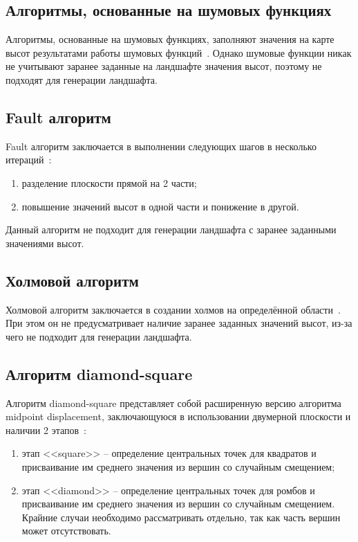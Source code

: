 \subsection{Алгоритмы, основанные на шумовых функциях}

Алгоритмы, основанные на шумовых функциях, заполняют значения на карте высот результатами работы шумовых функций~\cite{noises}. Однако шумовые функции никак не учитывают заранее заданные на ландшафте значения высот, поэтому не подходят для генерации ландшафта.

\subsection{Fault алгоритм}

Fault алгоритм заключается в выполнении следующих шагов в несколько итераций~\cite{nohabrinsource}:

\begin{enumerate}
	\item разделение плоскости прямой на 2 части;
	\item повышение значений высот в одной части и понижение в другой.
\end{enumerate}

Данный алгоритм не подходит для генерации ландшафта с заранее заданными значениями высот.

\subsection{Холмовой алгоритм}

Холмовой алгоритм заключается в создании холмов на определённой области~\cite{usages}. При этом он не предусматривает наличие заранее заданных значений высот, из-за чего не подходит для генерации ландшафта.

\subsection{Алгоритм diamond-square}

Алгоритм diamond-square представляет собой расширенную версию алгоритма midpoint displacement, заключающуюся в использовании двумерной плоскости и наличии 2 этапов~\cite{ds}:

\begin{enumerate}
	\item этап <<square>> -- определение центральных точек для квадратов и присваивание им среднего значения из вершин со случайным смещением;
	\item этап <<diamond>> -- определение центральных точек для ромбов и присваивание им среднего значения из вершин со случайным смещением. Крайние случаи необходимо рассматривать отдельно, так как часть вершин может отсутствовать.
\end{enumerate}

